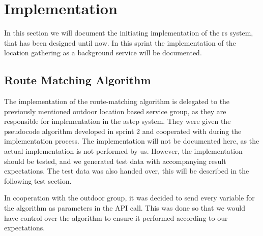 \section{Implementation}
In this section we will document the initiating implementation of the \gls{rs} system, that has been designed until now. 
In this sprint the implementation of the location gathering as a background service will be documented. 





\subsection{Route Matching Algorithm}\label{sec:routematchingalgorith}
The implementation of the route-matching algorithm is delegated to the previously mentioned outdoor location based service group, as they are responsible for implementation in the \gls{astep} system.
They were given the pseudocode algorithm developed in sprint 2 and cooperated with during the implementation process.
The implementation will not be documented here, as the actual implementation is not performed by us.
However, the implementation should be tested, and we generated test data with accompanying result expectations.
The test data was also handed over, this will be described in the following test section.

In cooperation with the outdoor group, it was decided to send every variable for the algorithm as parameters in the API call.
This was done so that we would have control over the algorithm to ensure it performed according to our expectations.